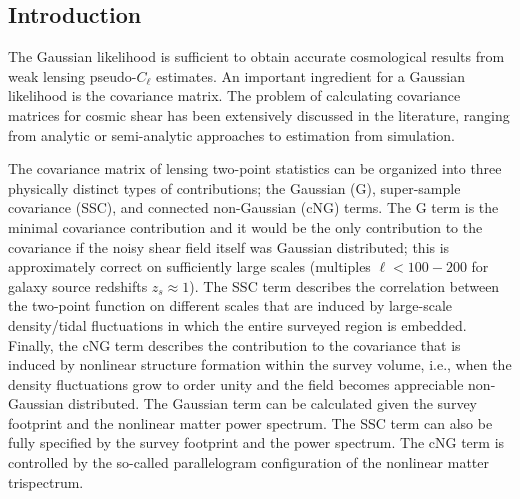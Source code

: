 \subsection{Introduction}

The Gaussian likelihood is sufficient to obtain accurate cosmological results from weak lensing pseudo-$C_\ell$ estimates. An important ingredient for a Gaussian likelihood is the covariance matrix. The problem of calculating covariance matrices for cosmic shear has been extensively discussed in the literature, ranging from analytic or semi-analytic approaches to estimation from simulation.

The covariance matrix of lensing two-point statistics can be organized into three physically distinct types of contributions; the Gaussian (G), super-sample covariance (SSC), and connected non-Gaussian (cNG) terms. The G term is the minimal covariance contribution and it would be the only contribution to the covariance if the noisy shear field itself was Gaussian distributed; this is approximately correct on sufficiently large scales (multiples $\ell < 100-200$ for galaxy source redshifts $z_s\approx1$). The SSC term describes the correlation between the two-point function on different scales that are induced by large-scale density/tidal fluctuations in which the entire surveyed region is embedded. Finally, the cNG term describes the contribution to the covariance that is induced by nonlinear structure formation within the survey volume, i.e., when the density fluctuations grow to order unity and the field becomes appreciable non-Gaussian distributed. The Gaussian term can be calculated given the survey footprint and the nonlinear matter power spectrum. The SSC term can also be fully specified by the survey footprint and the power spectrum. The cNG term is controlled by the so-called parallelogram configuration of the nonlinear matter trispectrum. 